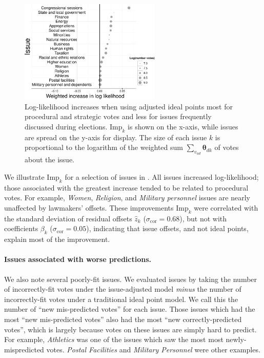 \begin{figure}
  \center
  \includegraphics[width=0.6\textwidth]{chapter_inferring_issue_preferences/figures/3393_interesting_offsets.pdf}
  \caption{Log-likelihood increases when using adjusted ideal points
  most for procedural and strategic votes and less for issues
  frequently discussed during elections.  $\mbox{Imp}_k$ is shown on
  the x-axis, while issues are spread on the y-axis for display.
  The size of each issue $k$ is proportional to the logarithm of the
  weighted sum $\sum_{v_{ud}} \bm \theta_{dk}$ of votes about the
  issue.}
  \label{fig:issue_improvements}
\end{figure}
We illustrate $\mbox{Imp}_k$ for a selection of issues in
.  All issues increased
log-likelihood; those associated with the greatest increase tended to
be related to procedural votes.  For example, \emph{Women},
\emph{Religion}, and \emph{Military personnel} issues are nearly
unaffected by lawmakers' offsets.  These improvements $\mbox{Imp}_k$
were correlated with the standard deviation of residual offsets $\hat
z_k$ ($\sigma_{\mbox{cor}}=0.68$), but not with coefficients $\beta_k$
($\sigma_{\mbox{cor}}=0.05$), indicating that issue offsets, and not
ideal points, explain most of the improvement.

\paragraph{Issues associated with worse predictions.}
We also note several poorly-fit issues.  We evaluated issues by taking
the number of incorrectly-fit votes under the issue-adjusted model
\emph{minus} the number of incorrectly-fit votes under a traditional ideal
point model.  We call this the number of ``new mis-predicted votes''
for each issue.  Those issues which had the most ``new mis-predicted
votes'' also had the most ``new correctly-predicted votes'', which is
largely because votes on these issues are simply hard to predict.  For
example, \emph{Athletics} was one of the issues which saw the most
most newly-mispredicted votes.  \emph{Postal Facilities} and
\emph{Military Personnel} were other examples.

